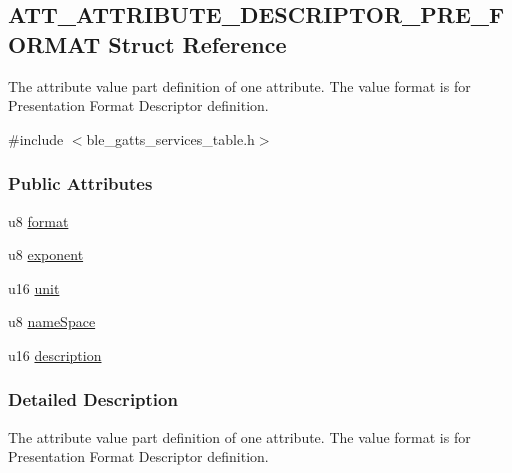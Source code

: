 \hypertarget{struct_a_t_t___a_t_t_r_i_b_u_t_e___d_e_s_c_r_i_p_t_o_r___p_r_e___f_o_r_m_a_t}{}\subsection{A\+T\+T\+\_\+\+A\+T\+T\+R\+I\+B\+U\+T\+E\+\_\+\+D\+E\+S\+C\+R\+I\+P\+T\+O\+R\+\_\+\+P\+R\+E\+\_\+\+F\+O\+R\+M\+AT Struct Reference}
\label{struct_a_t_t___a_t_t_r_i_b_u_t_e___d_e_s_c_r_i_p_t_o_r___p_r_e___f_o_r_m_a_t}


The attribute value part definition of one attribute. The value format is for Presentation Format Descriptor definition.  




{\ttfamily \#include $<$ble\+\_\+gatts\+\_\+services\+\_\+table.\+h$>$}

\subsubsection*{Public Attributes}
\begin{DoxyCompactItemize}
\item 
u8 \hyperlink{struct_a_t_t___a_t_t_r_i_b_u_t_e___d_e_s_c_r_i_p_t_o_r___p_r_e___f_o_r_m_a_t_a5341b83cdc9f6543c0796e32c434ddd1}{format}
\item 
u8 \hyperlink{struct_a_t_t___a_t_t_r_i_b_u_t_e___d_e_s_c_r_i_p_t_o_r___p_r_e___f_o_r_m_a_t_a8956c05ab611eae04ef8f870b3ef03c8}{exponent}
\item 
u16 \hyperlink{struct_a_t_t___a_t_t_r_i_b_u_t_e___d_e_s_c_r_i_p_t_o_r___p_r_e___f_o_r_m_a_t_a250098ffd7a4185faa739e2850dd57f2}{unit}
\item 
u8 \hyperlink{struct_a_t_t___a_t_t_r_i_b_u_t_e___d_e_s_c_r_i_p_t_o_r___p_r_e___f_o_r_m_a_t_adb5e22c156e19e4bc473f248125c647f}{name\+Space}
\item 
u16 \hyperlink{struct_a_t_t___a_t_t_r_i_b_u_t_e___d_e_s_c_r_i_p_t_o_r___p_r_e___f_o_r_m_a_t_a6a4f7506fc2c568c242bb23f90e1f566}{description}
\end{DoxyCompactItemize}


\subsubsection{Detailed Description}
The attribute value part definition of one attribute. The value format is for Presentation Format Descriptor definition. 

